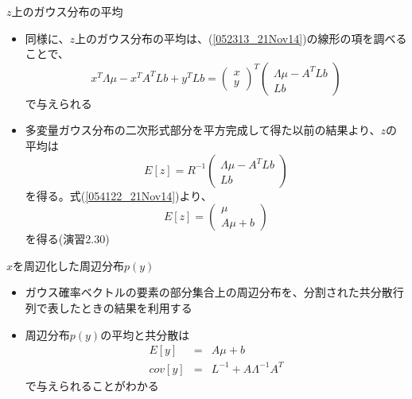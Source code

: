 \begin{frame}{$z$上のガウス分布の平均}
 \begin{itemize}
  \item 同様に、$z$上のガウス分布の平均は、(\ref{052313_21Nov14})の線形の項を調べることで、
        \begin{equation}
         x^T\Lambda\mu-x^TA^TLb+y^TLb =
          \begin{pmatrix}
           x \\
           y
          \end{pmatrix}^T
          \begin{pmatrix}
           \Lambda\mu-A^TLb \\
           Lb
          \end{pmatrix}
        \end{equation}
        で与えられる
  \item 多変量ガウス分布の二次形式部分を平方完成して得た以前の結果より、$z$の平均は
        \begin{equation}
         E[z]=R^{-1}
          \begin{pmatrix}
           \Lambda\mu-A^TLb \\
           Lb
          \end{pmatrix}
        \end{equation}
        を得る。式(\ref{054122_21Nov14})より、
        \begin{equation}
         E[z]=
          \begin{pmatrix}
           \mu \\
           A\mu + b
          \end{pmatrix}
        \end{equation}
        を得る(演習2.30)
 \end{itemize}
\end{frame}

\begin{frame}{$x$を周辺化した周辺分布$p(y)$}
 \begin{itemize}
  \item ガウス確率ベクトルの要素の部分集合上の周辺分布を、分割された共分散行列で表したときの結果を利用する
  \item 周辺分布$p(y)$の平均と共分散は
        \begin{eqnarray}
         E[y] &= &A\mu +b\\
         cov[y] &=& L^{-1} + A\Lambda^{-1}A^T
        \end{eqnarray}
        で与えられることがわかる
 \end{itemize}
\end{frame}


